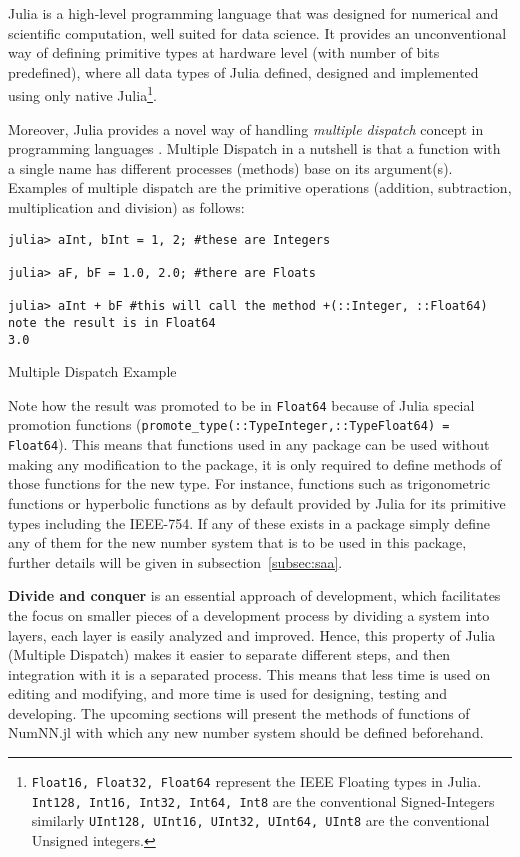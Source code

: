 Julia \cite{Julia,Bezanson2017} is a high-level programming language that was designed for numerical and scientific computation, well suited for data science. It provides an unconventional way of defining primitive types at hardware level (with number of bits predefined), where all data types of Julia defined, designed and implemented using only native Julia\footnote{\texttt{Float16, Float32, Float64} represent the IEEE Floating types in Julia. \texttt{Int128, Int16, Int32, Int64, Int8} are the conventional Signed-Integers similarly \texttt{UInt128, UInt16, UInt32, UInt64, UInt8} are the conventional Unsigned integers.}.

Moreover, Julia provides a novel way of handling \emph{multiple dispatch} \cite{WikiMultipleDispatch} concept in programming languages \cite{JuliaMehtods}. Multiple Dispatch in a nutshell is that a function with a single name has different processes (methods) base on its argument(s). Examples of multiple dispatch are the primitive operations (addition, subtraction, multiplication and division) as follows:

\begin{listing}[H]
\begin{verbatim}
julia> aInt, bInt = 1, 2; #these are Integers

julia> aF, bF = 1.0, 2.0; #there are Floats

julia> aInt + bF #this will call the method +(::Integer, ::Float64) note the result is in Float64
3.0
\end{verbatim}
\caption{Multiple Dispatch Example}
\end{listing}

Note how the result was promoted to be in \texttt{Float64} because of Julia special promotion functions (\texttt{promote_type(::Type{Integer},::Type{Float64}) = Float64}). This means that functions used in any package can be used without making any modification to the package, it is only required to define methods of those functions for the new type. For instance, functions such as trigonometric functions or hyperbolic functions as by default provided by Julia for its primitive types including the IEEE-754. If any of these exists in a package simply define any of them for the new number system that is to be used in this package, further details will be given in subsection~\ref{subsec:saa}.

\textbf{Divide and conquer} is an essential approach of development, which facilitates the focus on smaller pieces of a development process by dividing a system into layers, each layer is easily analyzed and improved. Hence, this property of Julia (Multiple Dispatch) makes it easier to separate different steps, and then integration with it is a separated process. This means that less time is used on editing and modifying, and more time is used for designing, testing and developing. The upcoming sections will present the methods of functions of NumNN.jl with which any new number system should be defined beforehand.

